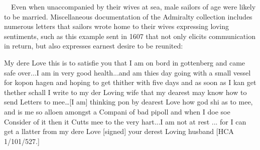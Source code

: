\begin{styleStandard}
\ \ Even when unaccompanied by their wives at sea, male sailors of age were likely to be married. Miscellaneous documentation of the Admiralty collection includes numerous letters that sailors wrote home to their wives expressing loving sentiments, such as this example sent in 1607 that not only elicits communication in return, but also expresses earnest desire to be reunited:
\end{styleStandard}

\begin{styleStandard}
My dere Love this is to satisfie you that I am on bord in gottenberg and came safe over...I am in very good health...and am thies day going with a small vessel for kopon hagen and hoping to get thither with five days and as soon as I kan get thether schall I write to my der Loving wife that my dearest may know how to send Letters to mee…[I am] thinking pon by dearest Love how god shi as to mee, and is me so alloen amongst a Compani of bad pipoll and when I doe soe Consider of it then it Cutts mee to the very hart...I am not at rest ... for I can get a llatter from my dere Love [signed] your derest Loving husband [HCA 1/101/527.]
\end{styleStandard}

